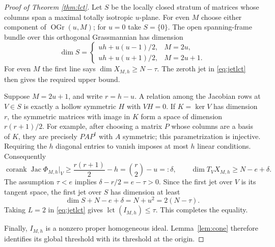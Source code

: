 \documentclass[11pt]{article}
\numberwithin{equation}{section}
\theoremstyle{remark}
\newcommand{\lct}{\operatorname{lct}}
\newcommand{\Gr}{\operatorname{OGr}}
\begin{document}
\begin{proof}[Proof of Theorem \ref{thm:lct}]
Let $S$ be the locally closed stratum of matrices whose columns
span a maximal totally isotropic $u$-plane. For even $M$ choose
either component of $\Gr(u,M)$; for $u=0$ take $S=\{0\}$.
The open spanning-frame bundle over this orthogonal Grassmannian
has dimension
\begin{equation}\label{eq:stratum}
 \dim S=
 \begin{cases}
 uh+u(u-1)/2,&M=2u,\\
 uh+u(u+1)/2,&M=2u+1.
 \end{cases}
\end{equation}
For even $M$ the first line says $\dim X_{M,h}\ge N-\tau$.
The zeroth jet in \eqref{eq:jetlct} then gives the required
upper bound.

Suppose $M=2u+1$, and write $r=h-u$. A relation among the
Jacobian rows at $V\in S$ is exactly a hollow symmetric $H$
with $VH=0$. If $K=\ker V$ has dimension $r$, the symmetric
matrices with image in $K$ form a space of dimension
$r(r+1)/2$. For example, after choosing a matrix $P$ whose
columns are a basis of $K$, they are precisely $PAP^t$ with
$A$ symmetric; this parametrization is injective. Requiring
the $h$ diagonal entries to vanish imposes at most $h$
linear conditions. Consequently
\[
 \operatorname{corank}\operatorname{Jac}\Phi_{M,h}|_V
       \ge\frac{r(r+1)}2-h=\binom r2-u=:\delta,
 \qquad
 \dim T_VX_{M,h}\ge N-e+\delta .
\]
The assumption $\tau<e$ implies
$\delta-r/2=e-\tau>0$. Since the first jet over $V$ is
its tangent space, the first jet over $S$ has dimension at least
\[
 \dim S+N-e+\delta
       =N+u^2=2(N-\tau).
\]
Taking $L=2$ in \eqref{eq:jetlct} gives
$\lct(I_{M,h})\le\tau$. This completes the equality.

Finally, $I_{M,h}$ is a nonzero proper homogeneous ideal.
Lemma~\ref{lem:cone} therefore identifies its global threshold
with its threshold at the origin.
\end{proof}
\end{document}

